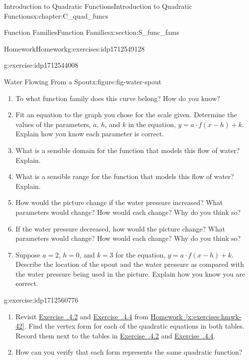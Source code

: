 \documentclass[oneside,10pt,]{book}
\newcommand{\xreffont}{\relax}
\numberwithin{equation}{chapter}
\begin{document}
\begin{chapterptx}{Introduction to Quadratic Functions}{}{Introduction to Quadratic Functions}{}{}{x:chapter:C_quad_funcs}
\begin{sectionptx}{Function Families}{}{Function Families}{}{}{x:section:S_func_fams}
\begin{exercises-subsection}{Homework}{}{Homework}{}{}{g:exercises:idp1712549128}
\begin{divisionexercise}{4}{}{}{g:exercise:idp1712544008}
\begin{figureptx}{Water Flowing From a Spout}{x:figure:fig-water-spout}{}
\begin{image}{0.2}{0.6}{0.2}
\end{image}%
\tcblower
\end{figureptx}%
\begin{enumerate}[font=\bfseries,label=(\alph*),ref=\alph*]
\item{}To what function family does this curve belong? How do you know?%
\item{}Fit an equation to the graph you chose for the scale given. Determine the values of the parameters, \(a\), \(h\), and \(k\) in the equation, \(y = a \cdot f(x - h) + k\). Explain how you know each parameter is correct.%
\item{}What is a sensible domain for the function that models this flow of water? Explain.%
\item{}What is a sensible range for the function that models this flow of water? Explain.%
\item{}How would the picture change if the water pressure increased? What parameters would change? How would each change? Why do you think so?%
\item{}If the water pressure decreased, how would the picture change? What parameters would change? How would each change? Why do you think so?%
\item{}Suppose \(a=2\), \(h=0\), and \(k=3\) for the equation, \(y=a \cdot f(x-h)+k\). Describe the location of the spout and the water pressure as compared with the water pressure being used in the picture. Explain how you know you are correct.%
\end{enumerate}
\end{divisionexercise}%
\begin{divisionexercise}{5}{}{}{g:exercise:idp1712560776}%
\begin{enumerate}[font=\bfseries,label=(\alph*),ref=\alph*]
\item{}Revisit \hyperlink{x:exercise:exer-factored-eqs}{Exercise~{\xreffont 4.2.4.2}} and \hyperlink{x:exercise:exer-quad-funcs-stnd}{Exercise~{\xreffont 4.2.4.4}} from \hyperref[x:exercises:hmwk-42]{Homework~{\xreffont\ref{x:exercises:hmwk-42}}}. Find the vertex form for each of the quadratic equations in both tables. Record them next to the tables in \hyperlink{x:exercise:exer-factored-eqs}{Exercise~{\xreffont 4.2.4.2}} and \hyperlink{x:exercise:exer-quad-funcs-stnd}{Exercise~{\xreffont 4.2.4.4}}.%
\item{}How can you verify that each form represents the same quadratic function?%

\end{enumerate}
\end{divisionexercise}
\end{exercises-subsection}
\end{sectionptx}
\end{chapterptx}
\end{document}
